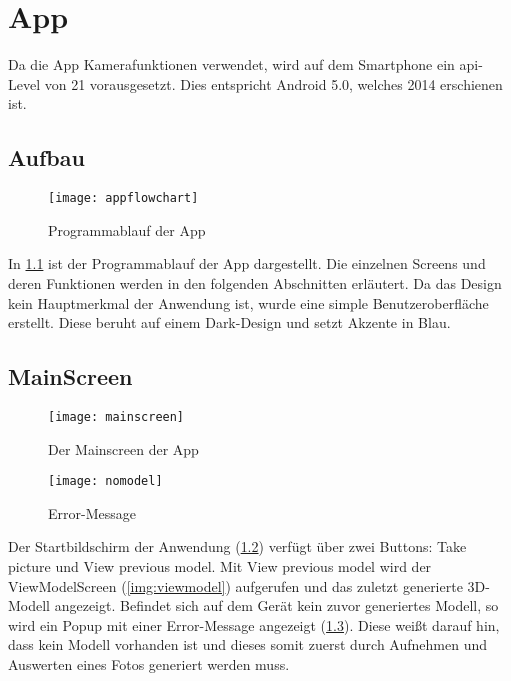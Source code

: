 \chapter{App}
\label{ch:app}

Da die App Kamerafunktionen verwendet, wird auf dem Smartphone ein \acrshort{api}-Level von 21 vorausgesetzt. Dies entspricht Android 5.0, welches 2014 erschienen ist.

\section{Aufbau}
\begin{figure}[htpb]
    \centering
    \texttt{[image: appflowchart]}
    \caption{Programmablauf der App}
    \label{img:appflowchart}
\end{figure}

In \ref{img:appflowchart} ist der Programmablauf der App dargestellt. Die einzelnen Screens und deren Funktionen werden in den folgenden Abschnitten erläutert. \newline
Da das Design kein Hauptmerkmal der Anwendung ist, wurde eine simple Benutzeroberfläche erstellt. Diese beruht auf einem Dark-Design und setzt Akzente in Blau.

\pagebreak
\section{MainScreen}
\label{sec:mainscreen}
\begin{figure}[htpb]
    \centering
    \texttt{[image: mainscreen]}
    \caption{Der Mainscreen der App}
    \label{img:mainscreen}
\end{figure}

\begin{figure}[htpb]
    \centering
    \texttt{[image: nomodel]}
    \caption{Error-Message}
    \label{img:nomodel}
\end{figure}

Der Startbildschirm der Anwendung (\ref{img:mainscreen}) verfügt über zwei Buttons: \glqq{}Take picture\grqq{} und \glqq{}View previous model\grqq{}. \newline
Mit \glqq{}View previous model\grqq{} wird der ViewModelScreen (\ref{img:viewmodel}) aufgerufen und das zuletzt generierte 3D-Modell angezeigt. Befindet sich auf dem Gerät 
kein zuvor generiertes Modell, so wird ein Popup mit einer Error-Message angezeigt (\ref{img:nomodel}). Diese weißt darauf hin, dass kein Modell vorhanden ist und dieses somit zuerst 
durch Aufnehmen und Auswerten eines Fotos generiert werden muss.

